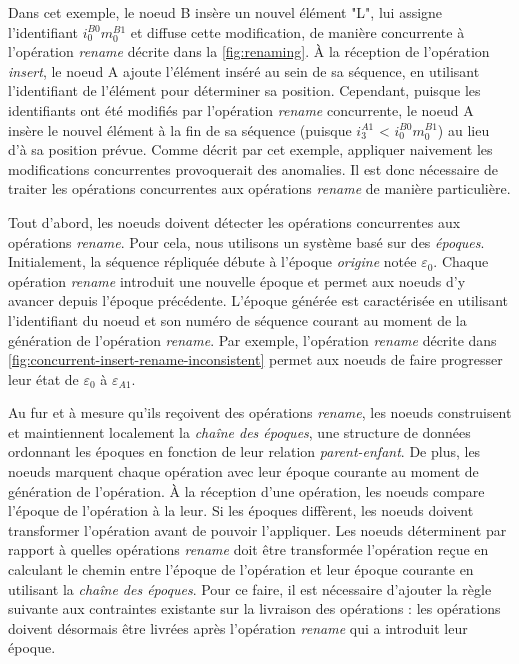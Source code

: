 \documentclass[12pt]{thesul}
\newcommand{\trm}[1]{\mathit{#1}}
\newcommand{\id}[3]{$\trm{#1}^{\trm{#2}}_{\trm{#3}}$}
\newcommand{\epoch}[1]{$\varepsilon_{#1}$}
\begin{document}
Dans cet exemple, le noeud B insère un nouvel élément "L", lui assigne l'identifiant \id{i}{B0}{0}\id{m}{B1}{0} et diffuse cette modification, de manière concurrente à l'opération \emph{rename} décrite dans la \autoref{fig:renaming}.
À la réception de l'opération \emph{insert}, le noeud A ajoute l'élément inséré au sein de sa séquence, en utilisant l'identifiant de l'élément pour déterminer sa position.
Cependant, puisque les identifiants ont été modifiés par l'opération \emph{rename} concurrente, le noeud A insère le nouvel élément à la fin de sa séquence (puisque \id{i}{A1}{3} < \id{i}{B0}{0}\id{m}{B1}{0}) au lieu d'à sa position prévue.
Comme décrit par cet exemple, appliquer naivement les modifications concurrentes provoquerait des anomalies.
Il est donc nécessaire de traiter les opérations concurrentes aux opérations \emph{rename} de manière particulière.

Tout d'abord, les noeuds doivent détecter les opérations concurrentes aux opérations \emph{rename}.
Pour cela, nous utilisons un système basé sur des \emph{époques}.
Initialement, la séquence répliquée débute à l'époque \emph{origine} notée \epoch{0}.
Chaque opération \emph{rename} introduit une nouvelle époque et permet aux noeuds d'y avancer depuis l'époque précédente.
L'époque générée est caractérisée en utilisant l'identifiant du noeud et son numéro de séquence courant au moment de la génération de l'opération \emph{rename}.
Par exemple, l'opération \emph{rename} décrite dans \autoref{fig:concurrent-insert-rename-inconsistent} permet aux noeuds de faire progresser leur état de \epoch{0} à \epoch{A1}.

Au fur et à mesure qu'ils reçoivent des opérations \emph{rename}, les noeuds construisent et maintiennent localement la \emph{chaîne des époques}, une structure de données ordonnant les époques en fonction de leur relation \emph{parent-enfant}.
De plus, les noeuds marquent chaque opération avec leur époque courante au moment de génération de l'opération.
À la réception d'une opération, les noeuds compare l'époque de l'opération à la leur.
Si les époques diffèrent, les noeuds doivent transformer l'opération avant de pouvoir l'appliquer.
Les noeuds déterminent par rapport à quelles opérations \emph{rename} doit être transformée l'opération reçue en calculant le chemin entre l'époque de l'opération et leur époque courante en utilisant la \emph{chaîne des époques}.
Pour ce faire, il est nécessaire d'ajouter la règle suivante aux contraintes existante sur la livraison des opérations : les opérations doivent désormais être livrées après l'opération \emph{rename} qui a introduit leur époque.
\end{document}
